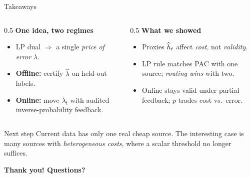 \begin{frame}{Takeaways}
  \begin{columns}[T]
    \begin{column}{0.5\textwidth}
      \textbf{One idea, two regimes}
      \begin{itemize}
        \item LP dual $\Rightarrow$ a single \emph{price of error} $\lambda$.
        \item \textbf{Offline:} certify $\hat\lambda$ on held-out labels.
        \item \textbf{Online:} move $\lambda_t$ with audited
              inverse-probability feedback.
      \end{itemize}
    \end{column}
    \begin{column}{0.5\textwidth}
      \textbf{What we showed}
      \begin{itemize}
        \item Proxies $\widehat h_t$ affect \emph{cost}, not \emph{validity}.
        \item LP rule matches PAC with one source; \emph{routing wins} with two.
        \item Online stays valid under partial feedback; $p$ trades cost vs.\ error.
      \end{itemize}
    \end{column}
  \end{columns}
  \vfill
  \begin{block}{Next step}
    Current data has only one real cheap source. The interesting case is many
    sources with \emph{heterogeneous costs}, where a scalar threshold no longer
    suffices.
  \end{block}
  \vfill
  \centering\textbf{\color{accent}Thank you! \quad Questions?}
\end{frame}
